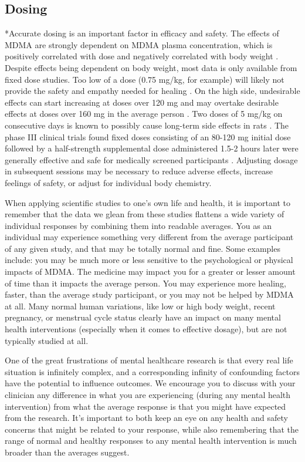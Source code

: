 \documentclass[12pt,letterpaper]{article}
\begin{document}
\subsection{Dosing}
\label{sec:dosing}
*Accurate dosing is an important factor in efficacy and safety. The effects of MDMA are strongly dependent on MDMA plasma concentration, which is positively correlated with dose and negatively correlated with body weight \cite{studerusResponse}. Despite effects being dependent on body weight, most data is only available from fixed dose studies. Too low of a dose (0.75 mg/kg, for example) will likely not provide the safety and empathy needed for healing \cite{bediMDMALowDose}. On the high side, undesirable effects can start increasing at doses over 120 mg and may overtake desirable effects at doses over 160 mg in the average person \cite{bruntLinking}. Two doses of 5 mg/kg on consecutive days is known to possibly cause long-term side effects in rats \cite{baumannRats}. The phase III clinical trials found fixed doses consisting of an 80-120 mg initial dose followed by a half-strength supplemental dose administered 1.5-2 hours later were generally effective and safe for medically screened participants \cite{mitchellMDMAClinicalTrial2}. Adjusting dosage in subsequent sessions may be necessary to reduce adverse effects, increase feelings of safety, or adjust for individual body chemistry.

When applying scientific studies to one's own life and health, it is important to remember that the data we glean from these studies flattens a wide variety of individual responses by combining them into readable averages. You as an individual may experience something very different from the average participant of any given study, and that may be totally normal and fine. Some examples include: you may be much more or less sensitive to the psychological or physical impacts of MDMA. The medicine may impact you for a greater or lesser amount of time than it impacts the average person. You may experience more healing, faster, than the average study participant, or you may not be helped by MDMA at all.  Many normal human variations, like low or high body weight, recent pregnancy, or menstrual cycle status clearly have an impact on many mental health interventions (especially when it comes to effective dosage), but are not typically studied at all.

One of the great frustrations of mental healthcare research is that every real life situation is infinitely complex, and a corresponding infinity of confounding factors have the potential to influence outcomes. We encourage you to discuss with your clinician any difference in what you are experiencing (during any mental health intervention) from what the average response is that you might have expected from the research. It's important to both keep an eye on any health and safety concerns that might be related to your response, while also remembering that the range of normal and healthy responses to any mental health intervention is much broader than the averages suggest.
\end{document}
